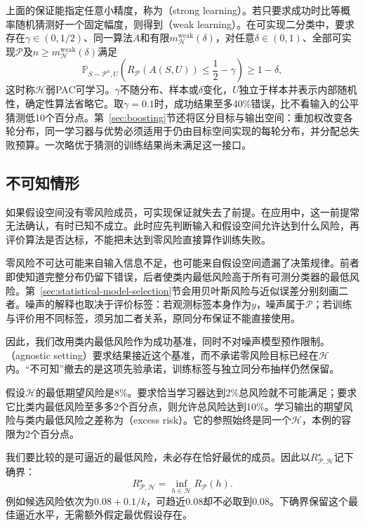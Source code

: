 上面的保证能指定任意小精度，称为（strong learning）。若只要求成功时比等概率随机猜测好一个固定幅度，则得到（weak learning）。在可实现二分类中，要求存在$\gamma\in(0,1/2)$、同一算法$A$和有限$m_{\mathcal H}^{\mathrm{weak}}(\delta)$，对任意$\delta\in(0,1)$、全部可实现$\mathcal P$及$n\geq m_{\mathcal H}^{\mathrm{weak}}(\delta)$满足
\[
 \mathbb P_{S\sim\mathcal P^n,U}\!\left(
 R_{\mathcal P}(A(S,U))\leq\frac12-\gamma
 \right)\geq1-\delta,
\]
这时称$\mathcal H$弱PAC可学习。$\gamma$不随分布、样本或$\delta$变化，$U$独立于样本并表示内部随机性，确定性算法省略它。取$\gamma=0.1$时，成功结果至多40\%错误，比不看输入的公平猜测低10个百分点。第~\ref{sec:boosting}节还将区分目标与输出空间：重加权改变各轮分布，同一学习器与优势必须适用于仍由目标空间实现的每轮分布，并分配总失败预算。一次略优于猜测的训练结果尚未满足这一接口。

\subsection{不可知情形}

如果假设空间没有零风险成员，可实现保证就失去了前提。在应用中，这一前提常无法确认，有时已知不成立。此时应先判断输入和假设空间允许达到什么风险，再评价算法是否达标，不能把未达到零风险直接算作训练失败。

零风险不可达可能来自输入信息不足，也可能来自假设空间遗漏了决策规律。前者即使知道完整分布仍留下错误，后者使类内最低风险高于所有可测分类器的最低风险。第~\ref{sec:statistical-model-selection}节会用贝叶斯风险与近似误差分别刻画二者。噪声的解释也取决于评价标签：若观测标签本身作为$y$，噪声属于$\mathcal P$；若训练与评价用不同标签，须另加二者关系，原同分布保证不能直接使用。

因此，我们改用类内最低风险作为成功基准，同时不对噪声模型预作限制。（agnostic setting）要求结果接近这个基准，而不承诺零风险目标已经在$\mathcal H$内。“不可知”撤去的是这项先验承诺，训练标签与独立同分布抽样仍然保留。

假设$\mathcal H$的最低期望风险是8\%。要求恰当学习器达到2\%总风险就不可能满足；要求它比类内最低风险至多多2个百分点，则允许总风险达到10\%。学习输出的期望风险与类内最低风险之差称为（excess risk）。它的参照始终是同一个$\mathcal H$，本例的容限为2个百分点。

我们要比较的是可逼近的最低风险，未必存在恰好最优的成员。因此以$R_{\mathcal P,\mathcal H}^\star$记下确界：
\begin{equation}
 R_{\mathcal P,\mathcal H}^\star=\inf_{h\in\mathcal H}R_{\mathcal P}(h).
 \label{eq:best-in-class-risk}
\end{equation}
例如候选风险依次为$0.08+0.1/k$，可趋近0.08却不必取到0.08。下确界保留这个最佳逼近水平，无需额外假定最优假设存在。

